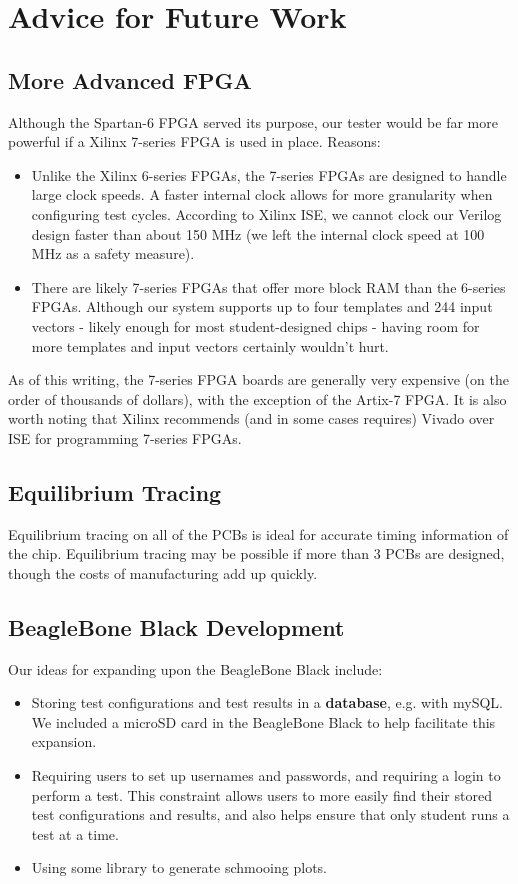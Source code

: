 \section{Advice for Future Work}

\subsection{More Advanced FPGA}
Although the Spartan-6 FPGA served its purpose, our tester would be far more powerful if a Xilinx 7-series FPGA is used in place. Reasons: 
\begin{itemize}
	\item Unlike the Xilinx 6-series FPGAs, the 7-series FPGAs are designed to handle large clock speeds. A faster internal clock allows for more granularity when configuring test cycles. According to Xilinx ISE, we cannot clock our Verilog design faster than about 150 MHz (we left the internal clock speed at 100 MHz as a safety measure). 
	\item There are likely 7-series FPGAs that offer more block RAM than the 6-series FPGAs. Although our system supports up to four templates and 244 input vectors - likely enough for most student-designed chips - having room for more templates and input vectors certainly wouldn't hurt.
\end{itemize}

As of this writing, the 7-series FPGA boards are generally very expensive (on the order of thousands of dollars), with the exception of the Artix-7 FPGA. It is also worth noting that Xilinx recommends (and in some cases requires) Vivado over ISE for programming 7-series FPGAs.

\subsection{Equilibrium Tracing}
Equilibrium tracing on all of the PCBs is ideal for accurate timing information of the chip. Equilibrium tracing may be possible if more than 3 PCBs are designed, though the costs of manufacturing add up quickly.

\subsection{BeagleBone Black Development}
Our ideas for expanding upon the BeagleBone Black include: 
\begin{itemize}
	\item Storing test configurations and test results in a \textbf{database}, e.g. with mySQL. We included a microSD card in the BeagleBone Black to help facilitate this expansion.
	\item Requiring users to set up usernames and passwords, and requiring a login to perform a test. This constraint allows users to more easily find their stored test configurations and results, and also helps ensure that only student runs a test at a time.
	\item Using some library to generate schmooing plots.
\end{itemize}

\newpage